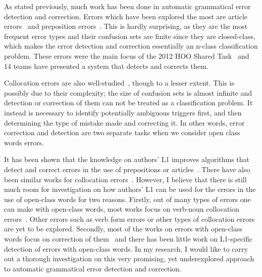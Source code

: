 \documentclass[11pt]{article}
\begin{document}
As stated previously, much work has been done in automatic grammatical error 
detection and correction. Errors which have been explored the most are article 
errors~\citep{han2006detecting, rozovskaya2010training, turner2007language, 
dahlmeier2011grammatical, de2008classifier} and preposition 
errors~\citep{bergsma2009web, tetreault2008ups, tetreault2010using, 
dahlmeier2011grammatical, de2008classifier, chodorow2007detection}. This is 
hardly surprising, as they are the most frequent error types and their confusion 
sets are finite since they are closed-class, which makes the error detection and 
correction essentially an n-class classification problem. These errors were the 
main focus of the 2012 HOO Shared Task~\citep{dale2012hoo} and 14 teams have 
presented a system that detects and corrects them.

Collocation errors are also well-studied~\citep{shei2000esl, 
wible2003bootstrapping, futagi2008computational, liu2009automated}, though to a 
lesser extent. This is possibly due to their complexity; the size of confusion 
sets is almost infinite and detection or correction of them can not be treated 
as a classification problem. It instead is necessary to identify potentially 
ambiguous triggers first, and then determining the type of mistake made and 
correcting it. In other words, error correction and detection are two separate 
tasks when we consider open class words errors.

It has been shown that the knowledge on authors' L1 improves algorithms that 
detect and correct errors in the use of prepositions or 
articles~\citep{rozovskaya2010generating, rozovskaya2011algorithm}. There have 
also been similar works for collocation errors~\citep{chang2008automatic, 
dahlmeier2011correcting, shei2000esl, liu2009automated}. However, I believe that 
there is still much room for investigation on how authors' L1 can be used for 
the errors in the use of open-class words for two reasons. Firstly, out of many 
types of errors one can make with open-class words, most works focus on 
verb-noun collocation errors~\citep{chang2008automatic, shei2000esl, 
liu2009automated}. Other errors such as verb form errors or other types of 
collocation errors are yet to be explored. Secondly, most of the works on errors 
with open-class words focus on correction of 
them~\citep{dahlmeier2011correcting, chang2008automatic} and there has been 
little work on L1-specific detection of errors with open-class words.  In my 
research, I would like to carry out a thorough investigation on this very 
promising, yet underexplored approach to automatic grammatical error detection 
and correction.
\end{document}
